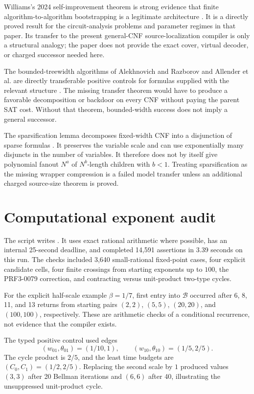 \documentclass[11pt]{article}
\newcommand{\B}{\mathcal B}
\begin{document}
Williams's 2024 self-improvement theorem is strong evidence that finite
algorithm-to-algorithm bootstrapping is a legitimate architecture
\cite{Williams2024}.  It is a directly proved result for the circuit-analysis
problems and parameter regimes in that paper.  Its transfer to the present
general-CNF source-localization compiler is only a structural analogy; the
paper does not provide the exact cover, virtual decoder, or charged successor
needed here.

The bounded-treewidth algorithms of Alekhnovich and Razborov and Allender et
al. are directly transferable positive controls for formulas supplied with
the relevant structure \cite{AlekhnovichRazborov2002,AllenderEtAl2014}.  The
missing transfer theorem would have to produce a favorable decomposition or
backdoor on every CNF without paying the parent SAT cost.  Without that
theorem, bounded-width success does not imply a general successor.

The sparsification lemma decomposes fixed-width CNF into a disjunction of
sparse formulas \cite{ImpagliazzoPaturiZane2001}.  It preserves the variable
scale and can use exponentially many disjuncts in the number of variables.
It therefore does not by itself give polynomial fanout $N^a$ of
$N^b$-length children with $b<1$.  Treating sparsification as the missing
wrapper compression is a failed model transfer unless an additional charged
source-size theorem is proved.

\section{Computational exponent audit}

The script  writes
.  It uses exact rational
arithmetic where possible, has an internal 25-second deadline, and completed
14,591 assertions in 3.39 seconds on this run.  The checks included 3,640
small-rational fixed-point cases, four explicit candidate cells, four finite
crossings from starting exponents up to $100$, the PRF3-0079 correction, and
contracting versus unit-product two-type cycles.

For the explicit half-scale example $\beta=1/7$, first entry into $\B$ occurred
after 6, 8, 11, and 13 returns from starting pairs $(2,2)$, $(5,5)$,
$(20,20)$, and $(100,100)$, respectively.  These are arithmetic checks of a
conditional recurrence, not evidence that the compiler exists.

The typed positive control used edges
\[
 (w_{01},\theta_{01})=(1/10,1),\qquad
 (w_{10},\theta_{10})=(1/5,2/5).
\]
The cycle product is $2/5$, and the least time budgets are
$(C_0,C_1)=(1/2,2/5)$.  Replacing the second scale by $1$ produced values
$(3,3)$ after 20 Bellman iterations and $(6,6)$ after 40, illustrating the
unsuppressed unit-product cycle.
\end{document}
